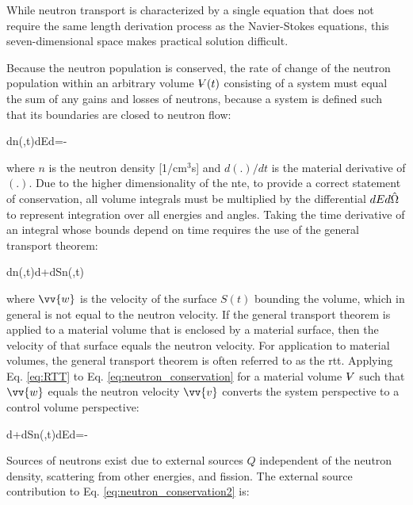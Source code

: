 While neutron transport is characterized by a single equation that does not require the same length derivation process as the Navier-Stokes equations, this seven-dimensional space makes practical solution difficult. 

Because the neutron population is conserved, the rate of change of the neutron population within an arbitrary volume \(\volume(t)\) consisting of a system must equal the sum of any gains and losses of neutrons, because a system is defined such that its boundaries are closed to neutron flow:

\beq
\label{eq:neutron_conservation}
\left\lbrack{}\int d\volume n(,t)\right\rbrack dEd\hO=-
\eeq

where \(n\) is the neutron density [1/cm$^3$s] and \(d(.)/dt\) is the material derivative of \((.)\). Due to the higher dimensionality of the \gls{nte}, to provide a correct statement of conservation, all volume integrals must be multiplied by the differential \(dEd\hat{\Omega}\) to represent integration over all energies and angles. Taking the time derivative of an integral whose bounds depend on time requires the use of the general transport theorem:

\beq
\label{eq:RTT}
\int d\volume n(,t)\equiv\int d\volume{}+\int dSn(,t)\cdot{}
\eeq

where \(\vv{w}\) is the velocity of the surface \(S(t)\) bounding the volume, which in general is not equal to the neutron velocity. If the general transport theorem is applied to a material volume that is enclosed by a material surface, then the velocity of that surface equals the neutron velocity. For application to material volumes, the general transport theorem is often referred to as the \gls{rtt}. Applying Eq. \eqref{eq:RTT} to Eq. \eqref{eq:neutron_conservation} for a material volume \(\volume\) such that \(\vv{w}\) equals the neutron velocity \(\vv{v}\) converts the system perspective to a control volume perspective:

\beq
\label{eq:neutron_conservation2}
\left\lbrack\int d\volume{}+\int dSn(,t)\cdot{}\right\rbrack dEd\hO=-
\eeq

Sources of neutrons exist due to external sources \(Q\) independent of the neutron density, scattering from other energies, and fission. The external source contribution to Eq. \eqref{eq:neutron_conservation2} is:

